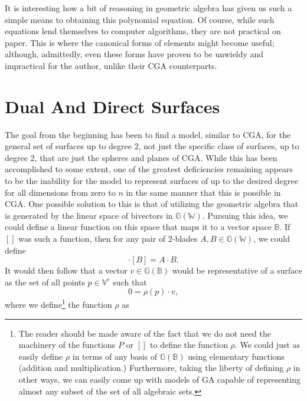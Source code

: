 \documentclass{birkjour}
\theoremstyle{definition}
\theoremstyle{remark}
\numberwithin{equation}{section}
\newcommand{\G}{\mathbb{G}}
\newcommand{\V}{\mathbb{V}}
\newcommand{\W}{\mathbb{W}}
\newcommand{\B}{\mathbb{B}}
\begin{document}
It is interesting how a bit of reasoning in geometric algebra has given us such a simple means
to obtaining this polynomial equation.
Of course, while such equations lend themselves to computer algorithms, they
are not practical on paper.  This is where the canonical forms of elements might become
useful; although, admittedly, even these forms have proven to be unwieldy
and impractical for the author, unlike their CGA counterparts.

\section{Dual And Direct Surfaces}\label{sec_deal_dir_surf}

The goal from the beginning has been to find a model, similar
to CGA, for the general set of surfaces up to degree 2,
not just the specific class of surfaces, up to degree 2, that are just the spheres and planes of CGA.
While this has been accomplished to some extent, one of the greatest deficiencies
remaining appears to be the inability for the model to represent surfaces of up to
the desired degree for
all dimensions from zero to $n$ in the same manner that this is possible in CGA.
One possible solution to this is that of utilizing the geometric
algebra that is generated by the linear space of bivectors in $\G(\W)$.  Pursuing
this idea, we could
define a linear function on this space that maps it to a vector space $\B$.  If $[]$ was such
a function, then for any pair of 2-blades $A,B\in\G(\W)$, we could define
\begin{equation}
[A]\cdot [B]=A\cdot B.
\end{equation}
It would then follow that a vector $v\in\G(\B)$ would be
representative of a surface as the set of all points $p\in\V^e$ such that
\begin{equation}\label{equ_dual_surf_set}
0 = \rho(p)\cdot v,
\end{equation}
where we define\footnote{The reader should be made aware of the fact
that we do not need the machinery of the functions $P$ or $[]$ to
define the function $\rho$.  We could just as easily define $\rho$
in terms of any basis of $\G(\B)$ using elementary functions (addition and multiplication.)  Furthermore, taking the liberty of defining
$\rho$ in other ways, we can easily come up with models of GA capable of representing
almost any subset of the set of all algebraic sets.} the function $\rho$ as
\end{document}
